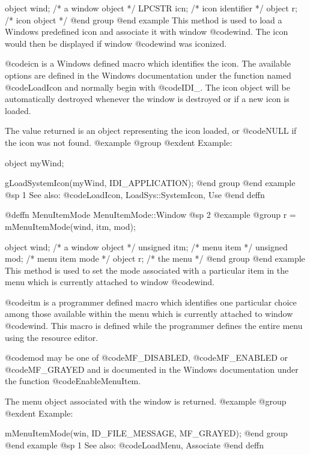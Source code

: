 object   wind;  /*  a window object  */
LPCSTR   icn;   /*  icon identifier  */
object   r;     /*  icon object      */
@end group
@end example
This method is used to load a Windows predefined icon and associate it
with window @code{wind}.  The icon would then be displayed if window
@code{wind} was iconized.

@code{icn} is a Windows defined macro which identifies the icon.  The
available options are defined in the Windows documentation under the
function named @code{LoadIcon} and normally begin with @code{IDI_}.  The
icon object will be automatically destroyed whenever the window is
destroyed or if a new icon is loaded.

The value returned is an object representing the icon loaded, or
@code{NULL} if the icon was not found.
@example
@group
@exdent Example:

object  myWind;

gLoadSystemIcon(myWind, IDI_APPLICATION);
@end group
@end example
@sp 1
See also:  @code{LoadIcon, LoadSys::SystemIcon, Use}
@end deffn














@deffn {MenuItemMode} MenuItemMode::Window
@sp 2
@example
@group
r = mMenuItemMode(wind, itm, mod);

object  wind;   /*  a window object     */
unsigned itm;   /*  menu item           */
unsigned mod;   /*  menu item mode      */
object   r;        /*  the menu         */
@end group
@end example
This method is used to set the mode associated with a particular item
in the menu which is currently attached to window @code{wind}.

@code{itm} is a programmer defined macro which identifies one particular
choice among those available within the menu which is currently attached
to window @code{wind}.  This macro is defined while the programmer defines
the entire menu using the resource editor.

@code{mod} may be one of @code{MF_DISABLED}, @code{MF_ENABLED} or
@code{MF_GRAYED} and is documented in the Windows documentation under
the function @code{EnableMenuItem}.

The menu object associated with the window is returned.
@example
@group
@exdent Example:

mMenuItemMode(win, ID_FILE_MESSAGE, MF_GRAYED);
@end group
@end example
@sp 1
See also:  @code{LoadMenu, Associate}
@end deffn











